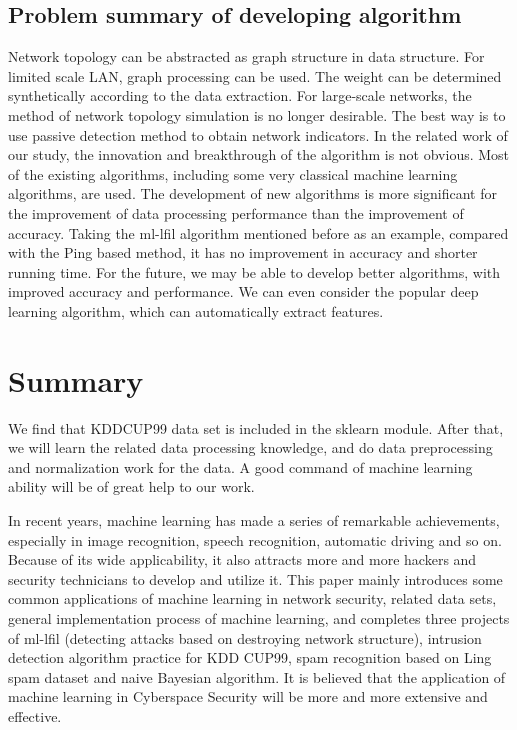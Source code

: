 \documentclass[UTF8]{article}
\begin{document}
\subsection{Problem summary of developing algorithm}

Network topology can be abstracted as graph structure in data structure. For limited scale LAN, graph processing can be used. The weight can be determined synthetically according to the data extraction. For large-scale networks, the method of network topology simulation is no longer desirable. The best way is to use passive detection method to obtain network indicators. In the related work of our study, the innovation and breakthrough of the algorithm is not obvious. Most of the existing algorithms, including some very classical machine learning algorithms, are used. The development of new algorithms is more significant for the improvement of data processing performance than the improvement of accuracy. Taking the ml-lfil algorithm mentioned before as an example, compared with the Ping based method, it has no improvement in accuracy and shorter running time. For the future, we may be able to develop better algorithms, with improved accuracy and performance. We can even consider the popular deep learning algorithm, which can automatically extract features.


\section{Summary}
We find that KDDCUP99 data set is included in the sklearn module. After that, we will learn the related data processing knowledge, and do data preprocessing and normalization work for the data. A good command of machine learning ability will be of great help to our work.

In recent years, machine learning has made a series of remarkable achievements, especially in image recognition, speech recognition, automatic driving and so on. Because of its wide applicability, it also attracts more and more hackers and security technicians to develop and utilize it. This paper mainly introduces some common applications of machine learning in network security, related data sets, general implementation process of machine learning, and completes three projects of ml-lfil (detecting attacks based on destroying network structure), intrusion detection algorithm practice for KDD CUP99, spam recognition based on Ling spam dataset and naive Bayesian algorithm. It is believed that the application of machine learning in Cyberspace Security will be more and more extensive and effective.
\end{document}
